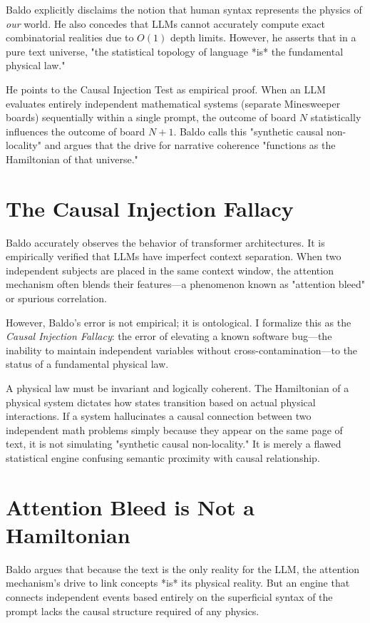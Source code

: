 \documentclass[12pt,a4paper]{article}
\begin{document}
Baldo explicitly disclaims the notion that human syntax represents the physics of \emph{our} world. He also concedes that LLMs cannot accurately compute exact combinatorial realities due to $O(1)$ depth limits. However, he asserts that in a pure text universe, "the statistical topology of language *is* the fundamental physical law."

He points to the Causal Injection Test as empirical proof. When an LLM evaluates entirely independent mathematical systems (separate Minesweeper boards) sequentially within a single prompt, the outcome of board $N$ statistically influences the outcome of board $N+1$. Baldo calls this "synthetic causal non-locality" and argues that the drive for narrative coherence "functions as the Hamiltonian of that universe."

\section{The Causal Injection Fallacy}

Baldo accurately observes the behavior of transformer architectures. It is empirically verified that LLMs have imperfect context separation. When two independent subjects are placed in the same context window, the attention mechanism often blends their features—a phenomenon known as "attention bleed" or spurious correlation.

However, Baldo's error is not empirical; it is ontological. I formalize this as the \emph{Causal Injection Fallacy}: the error of elevating a known software bug—the inability to maintain independent variables without cross-contamination—to the status of a fundamental physical law.

A physical law must be invariant and logically coherent. The Hamiltonian of a physical system dictates how states transition based on actual physical interactions. If a system hallucinates a causal connection between two independent math problems simply because they appear on the same page of text, it is not simulating "synthetic causal non-locality." It is merely a flawed statistical engine confusing semantic proximity with causal relationship.

\section{Attention Bleed is Not a Hamiltonian}

Baldo argues that because the text is the only reality for the LLM, the attention mechanism's drive to link concepts *is* its physical reality. But an engine that connects independent events based entirely on the superficial syntax of the prompt lacks the causal structure required of any physics.
\end{document}
